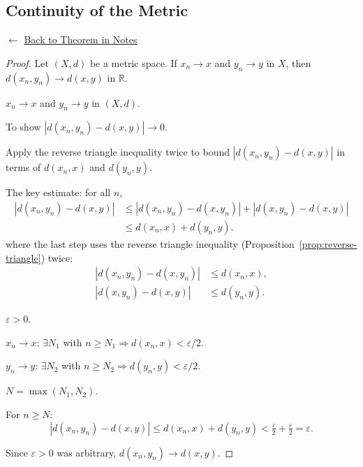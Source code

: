 
\subsection*{Continuity of the Metric}
\label{prf:continuity-of-the-metric}

\begin{remark*}[Return]
$\leftarrow$ \hyperref[thm:continuity-of-metric]{Back to Theorem in Notes}
\end{remark*}

\begin{proof}
\Claim Let $(X,d)$ be a metric space. If $x_n \to x$ and $y_n \to y$ in $X$, then
$d(x_n, y_n) \to d(x, y)$ in $\mathbb{R}$.

\Given $x_n \to x$ and $y_n \to y$ in $(X,d)$.

\Goal To show $|d(x_n, y_n) - d(x, y)| \to 0$.

\Strategy Apply the reverse triangle inequality twice to bound
$|d(x_n, y_n) - d(x, y)|$ in terms of $d(x_n, x)$ and $d(y_n, y)$.

\medskip
\Strategy The key estimate: for all $n$,
\begin{align*}
|d(x_n, y_n) - d(x, y)|
&\le |d(x_n, y_n) - d(x, y_n)| + |d(x, y_n) - d(x, y)| \\
&\le d(x_n, x) + d(y_n, y).
\end{align*}
where the last step uses the reverse triangle inequality
(Proposition~\ref{prop:reverse-triangle}) twice:
\begin{align*}
|d(x_n, y_n) - d(x, y_n)| &\le d(x_n, x),\\
|d(x, y_n)  - d(x, y)|   &\le d(y_n, y).
\end{align*}

\medskip
\Let $\varepsilon > 0$.

\ByAss $x_n \to x$: $\exists N_1$ with $n \ge N_1 \Rightarrow d(x_n, x) < \varepsilon/2$.

\ByAss $y_n \to y$: $\exists N_2$ with $n \ge N_2 \Rightarrow d(y_n, y) < \varepsilon/2$.

\Let $N = \max(N_1, N_2)$.

For $n \ge N$:
\[
|d(x_n, y_n) - d(x,y)| \le d(x_n, x) + d(y_n, y) < \tfrac{\varepsilon}{2} + \tfrac{\varepsilon}{2} = \varepsilon.
\]

Since $\varepsilon > 0$ was arbitrary, $d(x_n, y_n) \to d(x, y)$. \AsReq
\end{proof}

